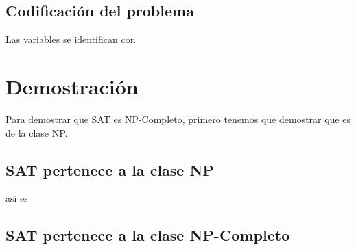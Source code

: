 \documentclass[a4paper]{article}
\begin{document}
\subsection{Codificación del problema}

Las variables se identifican con

\section{Demostración}
Para demostrar que SAT es NP-Completo, primero tenemos que demostrar que es de la clase NP.

\subsection{SAT pertenece a la clase NP}
así es

\subsection{SAT pertenece a la clase NP-Completo}





\nocite{*}


%
\end{document}
